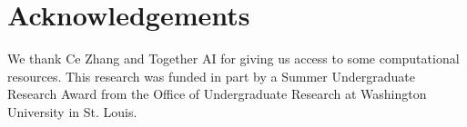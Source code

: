 \section*{Acknowledgements}
We thank Ce Zhang and Together AI for giving us access to some computational resources. This research was funded in part by a Summer Undergraduate Research Award from the Office of Undergraduate Research at Washington University in St. Louis.